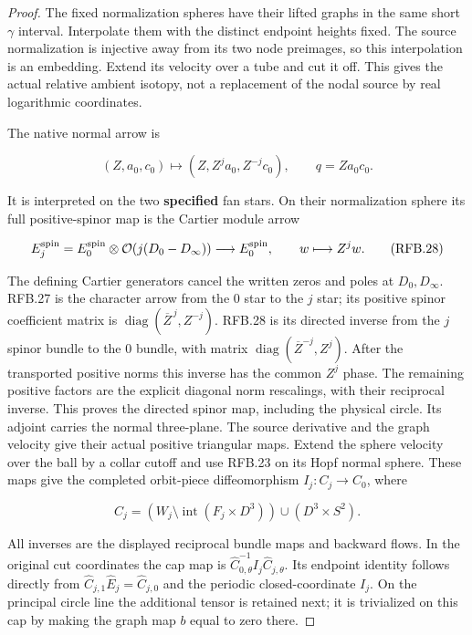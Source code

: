 \begin{proof}
The fixed normalization spheres have their lifted graphs in the
same short \(\gamma\) interval. Interpolate them with the distinct
endpoint heights fixed. The source normalization is injective away
from its two node preimages, so this interpolation is an embedding.
Extend its velocity over a tube and cut it off. This gives the actual
relative ambient isotopy, not a replacement of the nodal source by
real logarithmic coordinates.

The native normal arrow is

\[
 (Z,a_0,c_0)\mapsto(Z,Z^j a_0,Z^{-j}c_0),\qquad q=Za_0c_0.
 \tag{RFB.27}
\]

It is interpreted on the two \textbf{specified} fan stars. On their
normalization sphere its full positive-spinor map is the Cartier
module arrow

\[
 E_j^{\rm spin}=E_0^{\rm spin}\otimes
       \mathcal O(j(D_0-D_\infty))\longrightarrow E_0^{\rm spin},
                 \qquad w\longmapsto Z^j w.
 \tag{RFB.28}
\]

The defining Cartier generators cancel the written zeros and poles
at \(D_0,D_\infty\). RFB.27 is the character arrow from the \(0\)
star to the \(j\) star; its positive spinor coefficient matrix is
\(\operatorname{diag}(\overline Z^{\,j},Z^{-j})\). RFB.28 is its
directed inverse from the \(j\) spinor bundle to the \(0\) bundle,
with matrix
\(\operatorname{diag}(\overline Z^{-j},Z^j)\). After the transported
positive norms this inverse has the common \(Z^j\) phase. The
remaining positive factors are the explicit diagonal norm
rescalings, with their reciprocal inverse. This proves the
directed spinor map, including the physical circle. Its adjoint
carries the normal three-plane. The
source derivative and the graph velocity give their actual positive
triangular maps. Extend the sphere velocity over the ball by a
collar cutoff and use RFB.23 on its Hopf normal sphere. These maps
give the completed orbit-piece diffeomorphism \(I_j:C_j\to C_0\),
where

\[
 C_j=(W_j\setminus\operatorname{int}(F_j\times D^3))
                      \cup(D^3\times S^2).
 \tag{RFB.29}
\]

All inverses are the displayed reciprocal bundle maps and backward
flows. In the original cut coordinates the cap map is
\(\widehat C_{0,\theta}^{-1}I_j\widehat C_{j,\theta}\).
Its endpoint identity follows directly from
\(\widehat C_{j,1}\widehat E_j=\widehat C_{j,0}\) and the
periodic closed-coordinate \(I_j\). On the principal circle line
the additional tensor is retained next; it is trivialized on this
cap by making the graph map \(b\) equal to zero there.


\end{proof}
